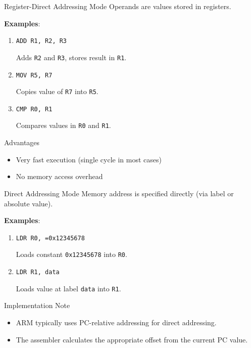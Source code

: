 \documentclass[aspectratio=169]{beamer}
\begin{document}
\begin{frame}{Register-Direct Addressing Mode}
    Operands are values stored in registers.
    
    \textbf{Examples}:
    \begin{enumerate}
        \item \texttt{ADD R1, R2, R3}  
        
        Adds \texttt{R2} and \texttt{R3}, stores result in \texttt{R1}.
        
        \item \texttt{MOV R5, R7}  
        
        Copies value of \texttt{R7} into \texttt{R5}.
        
        \item \texttt{CMP R0, R1}  
        
        Compares values in \texttt{R0} and \texttt{R1}.
    \end{enumerate}
    \begin{block}{Advantages}
        \begin{itemize}
        \item Very fast execution (single cycle in most cases)
        \item No memory access overhead
        \end{itemize}
    \end{block}

\end{frame}

\begin{frame}{Direct Addressing Mode}
    Memory address is specified directly (via label or absolute value).
    
    \textbf{Examples}:
    \begin{enumerate}
        \item \texttt{LDR R0, =0x12345678}  
        
        Loads constant \texttt{0x12345678} into \texttt{R0}.
        
        \item \texttt{LDR R1, data}  
        
        Loads value at label \texttt{data} into \texttt{R1}.
        
    \end{enumerate}

    \begin{block}{Implementation Note}
        \begin{itemize}
        \item ARM typically uses PC-relative addressing for direct addressing.
        \item The assembler calculates the appropriate offset from the current PC value.
        \end{itemize}
    \end{block}

\end{frame}
\end{document}

